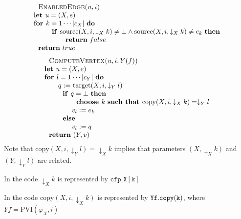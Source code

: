 \begin{equation*}
\begin{tabular}{l}
$\text{\textsc{EnabledEdge}}$\textsc{(}$u,i$\textsc{)} \\ 
\textbf{let }$u=(X,e)$ \\ 
\textbf{for }$k=1\cdots \left\vert c_{X}\right\vert $ \textbf{do} \\ 
$\qquad \text{\textbf{if }}\mathrm{source}(X,i,\downarrow _{X}k)\neq \bot
\wedge \mathrm{source}(X,i,\downarrow _{X}k)\neq e_{k}$ \textbf{then} \\ 
$\qquad \qquad \text{\textbf{return} }false$ \\ 
$\text{\textbf{return} }true$%
\end{tabular}%
\end{equation*}%
\begin{equation*}
\begin{tabular}{l}
$\text{\textsc{ComputeVertex}}$\textsc{(}$u,i,Y(f)$\textsc{)} \\ 
\textbf{let }$u=(X,e)$ \\ 
\textbf{for }$l=1\cdots \left\vert c_{Y}\right\vert $ \textbf{do} \\ 
$\qquad q:=$ $\mathrm{target}(X,i,\downarrow _{Y}l)$ \\ 
$\qquad \text{\textbf{if }}q=\bot $ \textbf{then} \\ 
$\qquad \qquad \text{\textbf{choose }}k$ \textbf{such that }$\mathrm{copy}%
(X,i,\downarrow _{X}k)=\downarrow _{Y}l$ \\ 
$\qquad \qquad v_{l}:=e_{k}$ \\ 
$\qquad \text{\textbf{else}}$ \\ 
$\qquad \qquad v_{l}:=q$ \\ 
$\text{\textbf{return} }(Y,v)$%
\end{tabular}%
\end{equation*}%
Note that $\mathrm{copy}(X,i,\downarrow _{Y}l)=\downarrow _{X}k$ implies
that parameters $(X,\downarrow _{X}k)$ and $(Y,\downarrow _{Y}l)$ are
related.

\begin{remark}
In the code $\downarrow _{X}k$ is represented by $\mathtt{cfp\_X[k]}$
\end{remark}

\begin{remark}
In the code $\mathrm{copy}(X,i,\downarrow _{X}k)$ is represented by $\mathtt{%
Yf.copy(k)}$, where $Yf=\mathrm{PVI}(\varphi _{X},i)$
\end{remark}

